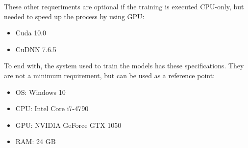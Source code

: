These other requeriments are optional if the training is executed CPU-only, but needed to speed up the process by using GPU:

\begin{itemize}
 \item Cuda 10.0
 \item CuDNN 7.6.5
\end{itemize}

To end with, the system used to train the models has these specifications. They are not a minimum requirement, but can be used as a reference point:

\begin{itemize}
 \item OS: Windows 10
 \item CPU: Intel Core i7-4790
 \item GPU: NVIDIA GeForce GTX 1050
 \item RAM: 24 GB
\end{itemize}
